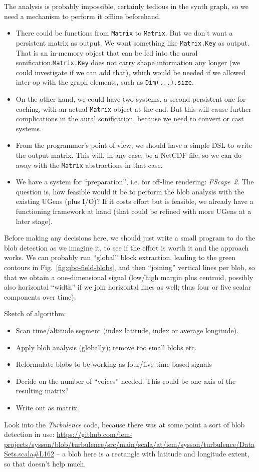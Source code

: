 \documentclass[11pt,a4paper]{article}
\newcommand{\figref}[1]{Fig.~\ref{#1}}
\newcommand{\software}[1]{\textit{#1}}
\begin{document}
The analysis is probably impossible, certainly tedious in the synth graph, so we need a mechanism to perform it offline beforehand.
%
\begin{itemize}
\item There could be functions from \Verb!Matrix! to \Verb!Matrix!. But we don't want a persistent matrix as output. We want something like \Verb!Matrix.Key! as output. That is an in-memory object that can be fed into the aural sonification.\Verb!Matrix.Key! does not carry shape information any longer (we could investigate if we can add that), which would be needed if we allowed inter-op with the graph elements, such as \Verb!Dim(...).size!.
\item On the other hand, we could have two systems, a second persistent one for caching, with an actual \Verb!Matrix! object at the end. But this will cause further complications in the aural sonification, because we need to convert or cast systems.
\item From the programmer's point of view, we should have a simple DSL to write the output matrix. This will, in any case, be a NetCDF file, so we can do away with the \Verb!Matrix! abstractions in that case.
\item We have a system for ``preparation'', i.e. for off-line rendering: \software{FScape~2}. The question is, how feasible would it be to perform the blob analysis with the existing UGens (plus I/O)? If it costs effort but is feasible, we already have a functioning framework at hand (that could be refined with more UGens at a later stage).
\end{itemize}
%
Before making any decisions here, we should just write a small program to do the blob detection as we imagine it, to see if the effort is worth it and the approach works. We can probably run ``global'' block extraction, leading to the green contours in \figref{fig:qbo-field-blobs}, and then ``joining'' vertical lines per blob, so that we obtain a one-dimensional signal (low/high margin plus centroid, possibly also horizontal ``width'' if we join horizontal lines as well; thus four or five scalar components over time).

Sketch of algorithm:
%
\begin{itemize}
\item Scan time/altitude segment (index latitude, index or average longitude).
\item Apply blob analysis (globally); remove too small blobs etc.
\item Reformulate blobs to be working as four/five time-based signals
\item Decide on the number of ``voices'' needed. This could be one axis of the resulting matrix?
\item Write out as matrix.
\end{itemize}
%
Look into the \software{Turbulence} code, because there was at some point a sort of blob detection in use: \url{https://github.com/iem-projects/sysson/blob/turbulence/src/main/scala/at/iem/sysson/turbulence/DataSets.scala#L162} -- a blob here is a rectangle with latitude and longitude extent, so that doesn't help much.
\end{document}
